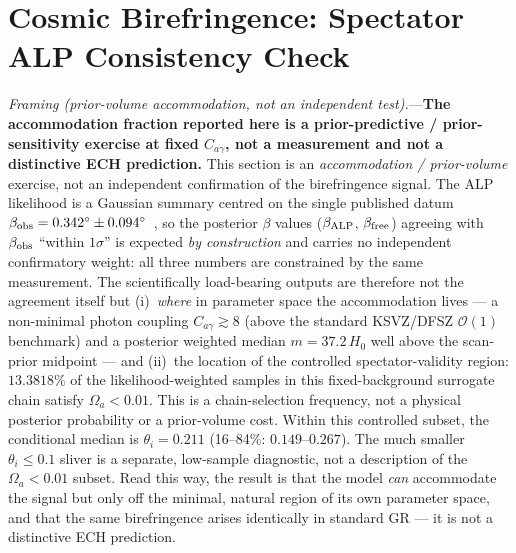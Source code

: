 \documentclass[aps,prd,twocolumn,superscriptaddress,showpacs,preprintnumbers,nofootinbib,longbibliography,floatfix]{revtex4-2}
\begin{document}
\section{Cosmic Birefringence: Spectator ALP Consistency Check}\label{sec:birefringence_check}

\textit{Framing (prior-volume accommodation, not an independent test).}---\textbf{The
accommodation fraction reported here is a prior-predictive / prior-sensitivity exercise
at fixed $C_{a\gamma}$, not a measurement and not a distinctive ECH prediction.}
This section is an \emph{accommodation / prior-volume} exercise, not an independent
confirmation of the birefringence signal. The ALP likelihood is a Gaussian
summary centred on the single published datum
$\beta_{\rm obs}=0.342^\circ\pm 0.094^\circ$~\cite{Eskilt2022}, so the
posterior $\beta$ values ($\beta_{\rm ALP}$, $\beta_{\rm free}$) agreeing with
$\beta_{\rm obs}$ ``within $1\sigma$'' is expected \emph{by construction} and
carries no independent confirmatory weight: all three numbers are constrained
by the same measurement. The scientifically load-bearing outputs are therefore
not the agreement itself but (i)~\emph{where} in parameter space the
accommodation lives --- a non-minimal photon coupling $C_{a\gamma}\gtrsim 8$
(above the standard KSVZ/DFSZ $\mathcal{O}(1)$ benchmark) and a posterior
weighted median $m=37.2\,H_0$ well above the scan-prior midpoint --- and
(ii)~the location of the controlled spectator-validity region: $13.3818\%$
of the likelihood-weighted samples in this fixed-background surrogate chain
satisfy $\Omega_a<0.01$. This is a chain-selection frequency, not a physical
posterior probability or a prior-volume cost. Within this controlled subset,
the conditional median is $\theta_i=0.211$ (16--84\%: $0.149$--$0.267$).
The much smaller $\theta_i\le0.1$ sliver is a separate, low-sample diagnostic,
not a description of the $\Omega_a<0.01$ subset. Read this way, the result is
that the model \emph{can} accommodate the signal but only off the minimal,
natural region of its own parameter space, and that the same birefringence
arises identically in standard GR --- it is not a distinctive ECH prediction.
\end{document}
